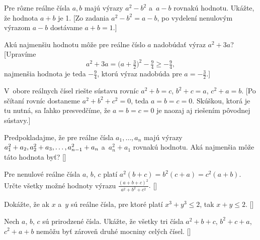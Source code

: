 {

Pre rôzne reálne čísla $a,b$ majú výrazy $a^2-b^2$ a~$a-b$ rovnakú hodnotu. Ukážte, že hodnota $a+b$ je 1.
 [Zo zadania $a^2-b^2=a-b$, po vydelení nenulovým výrazom $a-b$ dostávame $a+b=1$.]

Akú najmenšiu hodnotu môže pre reálne číslo $a$ nadobúdať výraz $a^2+3a$?
 [Upravíme $$a^2+3a=\bigl(a+\tfrac32\bigr)^2-\tfrac94\geq-\tfrac94,$$ najmenšia hodnota je teda ${-\frac94}$, ktorú výraz nadobúda pre $a={-\frac32}$.]

V~obore reálnych čísel riešte sústavu rovníc $a^2+b=c$, $b^2+c=a$, $c^2+a=b$.
 [Po sčítaní rovníc dostaneme $a^2+b^2+c^2=0$, teda $a=b=c=0$. Skúškou, ktorá je tu nutná, sa ľahko presvedčíme, že $a=b=c=0$ je naozaj aj riešením pôvodnej sústavy.]

\D

Predpokladajme, že pre reálne čísla $a_1,\dots,a_n$ majú výrazy $a_1^2+a_2, a_2^2+a_3, \dots,\penalty 0 a_{n-1}^2+a_n$ a~$a_n^2+a_1$ rovnakú hodnotu. Aká najmenšia môže táto hodnota byť?
 []

Pre nenulové reálne čísla $a$, $b$, $c$ platí
$a^2(b+c)=b^2(c+a)=c^2(a+b).$
Určte všetky možné hodnoty výrazu
$\frac{(a+b+c)^2}{a^2+b^2+c^2}.$
    []

Dokážte, že ak $x$ a~$y$ sú reálne čísla, pre ktoré platí $x^3+y^3\le2$, tak $x+y\le2$.
     []

Nech $a$, $b$, $c$ sú prirodzené čísla. Ukážte, že všetky tri čísla $a^2+b+c$, $b^2+c+a$, $c^2+a+b$ nemôžu byť zároveň druhé mocniny celých čísel.    []



}

